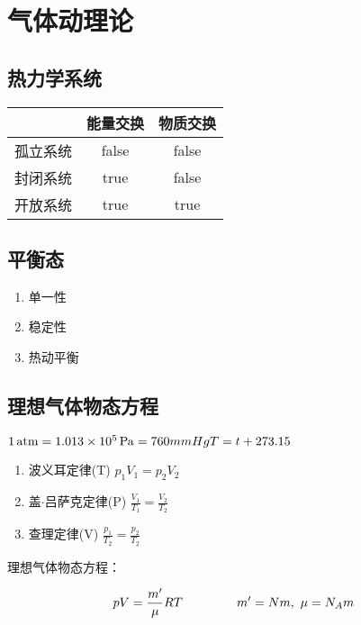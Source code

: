 \chapter{气体动理论}
\newpage

\section{热力学系统}

\begin{table}[!htbp]
    \centering
    \begin{tabular}{l|c|c}
        \toprule
                 & 能量交换 & 物质交换 \\
        \midrule
        孤立系统 & false    & false    \\
        封闭系统 & true     & false    \\
        开放系统 & true     & true     \\
        \bottomrule
    \end{tabular}
\end{table}

\section{平衡态}

\begin{enumerate}
    \item 单一性
    \item 稳定性
    \item 热动平衡
\end{enumerate}

\section{理想气体物态方程}

$1\,\mathrm{atm}=1.013\times10^5\,\mathrm{Pa}=760mmHg\\T=t+273.15$

\begin{enumerate}
    \item 波义耳定律(T)
          $p_1V_1=p_2V_2$
    \item 盖$\cdot$吕萨克定律(P)
          $\frac{V_1}{T_1}=\frac{V_2}{T_2}$
    \item 查理定律(V)
          $\frac{p_1}{T_2}=\frac{p_2}{T_2}$
\end{enumerate}

理想气体物态方程：

\begin{equation}
    pV=\frac{m'}{\mu}RT\hspace{10ex}m'=Nm ,~ \mu=N_Am
\end{equation}

